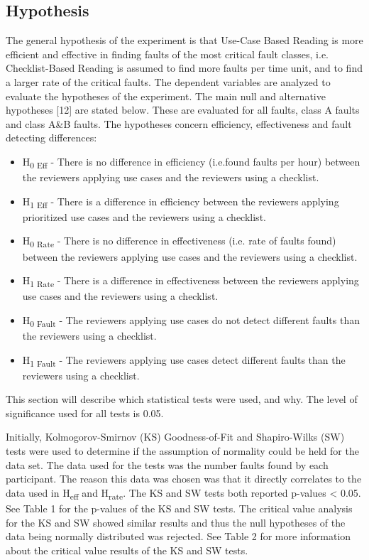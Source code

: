 \documentclass[10pt,twocolumn]{article}
\begin{document}
\subsection{Hypothesis}
The general hypothesis of the experiment is that Use-Case
Based Reading is more efficient and effective in finding faults
of the most critical fault classes, i.e. Checklist-Based Reading
is assumed to find more faults per time unit, and to find a
larger rate of the critical faults.
The dependent variables are analyzed to evaluate the
hypotheses of the experiment. The main null and alternative
hypotheses [12] are stated below. These are evaluated for all
faults, class A faults and class A\&B faults. The hypotheses
concern efficiency, effectiveness and fault detecting
differences:
\begin{itemize}
\item H\textsubscript{0 Eff} - There is no difference in efficiency (i.e.found faults per hour) between the reviewers applying use cases and the reviewers using a checklist.
\item H\textsubscript{1 Eff} - There is a difference in efficiency between the reviewers applying prioritized use cases and the reviewers using a checklist.
\item H\textsubscript{0 Rate} - There is no difference in effectiveness (i.e. rate of faults found) between the reviewers applying use cases and the reviewers using a checklist.
\item H\textsubscript{1 Rate} - There is a difference in effectiveness between the reviewers applying use cases and the reviewers using a checklist.
\item H\textsubscript{0 Fault} - The reviewers applying use cases do not detect different faults than the reviewers using a checklist.
\item H\textsubscript{1 Fault} - The reviewers applying use cases detect different faults than the reviewers using a checklist.

\end{itemize}

This section will describe which statistical tests were used, and why. The level of significance used for all tests is 0.05. 

Initially, Kolmogorov-Smirnov (KS) Goodness-of-Fit and Shapiro-Wilks (SW) tests were used to determine if the assumption of normality could be held for the data set. The data used for the tests was the number faults found by each participant. The reason this data was chosen was that it directly correlates to the data used in H\textsubscript{eff} and H\textsubscript{rate}. The KS and SW tests both reported p-values < 0.05. See Table 1 for the p-values of the KS and SW tests. The critical value analysis for the KS and SW showed similar results and thus the null hypotheses of the data being normally distributed was rejected. See Table 2 for more information about the critical value results of the KS and SW tests.
\end{document}
